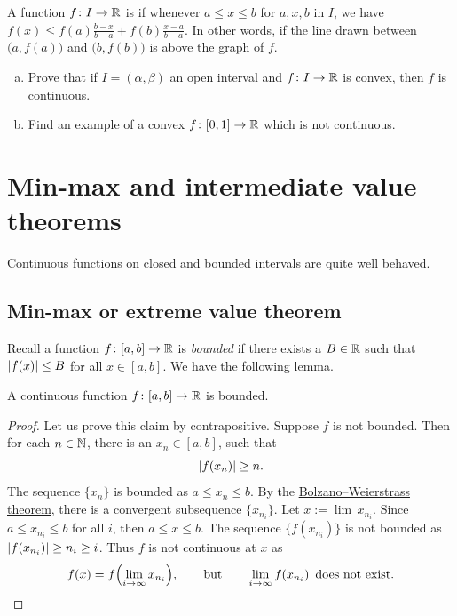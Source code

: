 \begin{exercise}[Challenging]
A function $f \colon I \to {\mathbb{R}}$ is \emph{} if
whenever $a \leq x \leq b$ for $a,x,b$ in $I$, we have
$f(x) \leq f(a) \frac{b-x}{b-a} + f(b) \frac{x-a}{b-a}$.  In other words,
if the line drawn between $\bigl(a,f(a)\bigr)$ and $\bigl(b,f(b)\bigr)$ 
is above the graph of $f$.
\begin{enumerate}[a)]
\item
Prove that
if $I = (\alpha,\beta)$ an open interval and $f \colon I \to {\mathbb{R}}$ is convex,
then $f$ is continuous.
\item
Find an example of a convex $f \colon [0,1] \to {\mathbb{R}}$ which is
not continuous.
\end{enumerate}
\end{exercise}



\sectionnewpage
\section{Min-max and intermediate value theorems}
\label{sec:minmaxint}


Continuous functions on closed and bounded intervals
are quite well behaved.

\subsection{Min-max or extreme value theorem}

Recall a function $f \colon [a,b] \to {\mathbb{R}}$ is
\emph{bounded}
if there exists a $B \in {\mathbb{R}}$ such that
$\left\lvert {f(x)} \right\rvert \leq B$ for all $x \in [a,b]$.  We have the following lemma.

\begin{lemma}
A continuous function $f \colon [a,b] \to {\mathbb{R}}$ is bounded.
\end{lemma}

\begin{proof}
Let us prove this claim by contrapositive.  Suppose $f$ is not bounded.
Then for each
$n \in {\mathbb{N}}$, there is an $x_n \in [a,b]$, such that
\begin{equation*}
\left\lvert {f(x_n)} \right\rvert \geq n .
\end{equation*}
The sequence $\{ x_n \}$ is bounded as $a \leq x_n \leq b$.
By the \hyperref[thm:bwseq]{Bolzano--Weierstrass theorem},
there is a convergent subsequence $\{ x_{n_i} \}$.  Let $x := \lim\, x_{n_i}$.
Since $a \leq x_{n_i} \leq b$ for all $i$, then $a \leq x \leq b$.
The sequence $\{ f(x_{n_i}) \}$ is not bounded 
as 
$\left\lvert {f(x_{n_i})} \right\rvert \geq n_i \geq i$.
Thus $f$ is not continuous at $x$ as
\begin{equation*}
f(x)
=
f\Bigl( \lim_{i\to\infty} x_{n_i} \Bigr) ,
\qquad \text{but} \qquad
\lim_{i\to\infty} f(x_{n_i}) \enspace \text{does not exist.} \qedhere
\end{equation*}
\end{proof}

